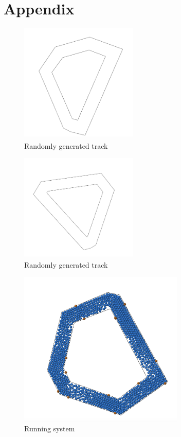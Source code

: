 \documentclass[]{usiinfbachelorproject}
\begin{document}
\newpage
\section{Appendix}

\begin{figure} [ht]
  \centering
  \includegraphics[width=0.5\textwidth]{track1.png}
  \caption{Randomly generated track}
  \label{fig:Track1}
\end{figure}

\begin{figure} [h]
  \centering
  \includegraphics[width=0.5\textwidth]{track2.png}
  \caption{Randomly generated track}
  \label{fig:Track2}
\end{figure}

\begin{figure} [ht]
  \centering
  \includegraphics[width=0.7\textwidth]{running.png}
  \caption{Running system}
  \label{fig:Running}
\end{figure}

\clearpage



\end{document}
